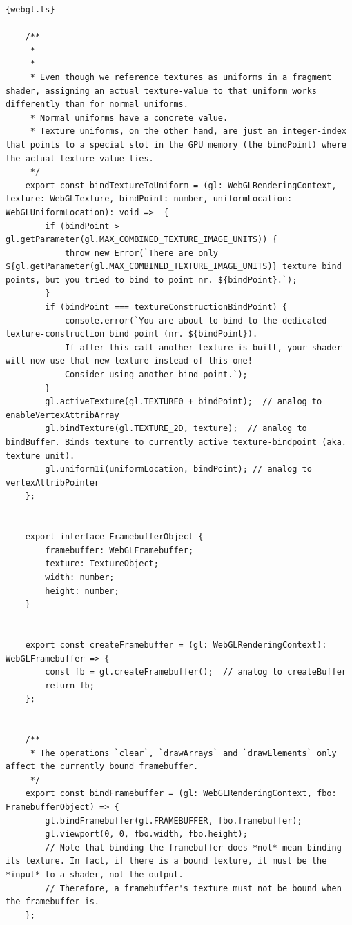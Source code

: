 \begin{lstlisting}{webgl.ts}
    
    /**
     *
     *
     * Even though we reference textures as uniforms in a fragment shader, assigning an actual texture-value to that uniform works differently than for normal uniforms.
     * Normal uniforms have a concrete value.
     * Texture uniforms, on the other hand, are just an integer-index that points to a special slot in the GPU memory (the bindPoint) where the actual texture value lies.
     */
    export const bindTextureToUniform = (gl: WebGLRenderingContext, texture: WebGLTexture, bindPoint: number, uniformLocation: WebGLUniformLocation): void =>  {
        if (bindPoint > gl.getParameter(gl.MAX_COMBINED_TEXTURE_IMAGE_UNITS)) {
            throw new Error(`There are only ${gl.getParameter(gl.MAX_COMBINED_TEXTURE_IMAGE_UNITS)} texture bind points, but you tried to bind to point nr. ${bindPoint}.`);
        }
        if (bindPoint === textureConstructionBindPoint) {
            console.error(`You are about to bind to the dedicated texture-construction bind point (nr. ${bindPoint}).
            If after this call another texture is built, your shader will now use that new texture instead of this one!
            Consider using another bind point.`);
        }
        gl.activeTexture(gl.TEXTURE0 + bindPoint);  // analog to enableVertexAttribArray
        gl.bindTexture(gl.TEXTURE_2D, texture);  // analog to bindBuffer. Binds texture to currently active texture-bindpoint (aka. texture unit).
        gl.uniform1i(uniformLocation, bindPoint); // analog to vertexAttribPointer
    };
    
    
    export interface FramebufferObject {
        framebuffer: WebGLFramebuffer;
        texture: TextureObject;
        width: number;
        height: number;
    }
    
    
    export const createFramebuffer = (gl: WebGLRenderingContext): WebGLFramebuffer => {
        const fb = gl.createFramebuffer();  // analog to createBuffer
        return fb;
    };
    
    
    /**
     * The operations `clear`, `drawArrays` and `drawElements` only affect the currently bound framebuffer.
     */
    export const bindFramebuffer = (gl: WebGLRenderingContext, fbo: FramebufferObject) => {
        gl.bindFramebuffer(gl.FRAMEBUFFER, fbo.framebuffer);
        gl.viewport(0, 0, fbo.width, fbo.height);
        // Note that binding the framebuffer does *not* mean binding its texture. In fact, if there is a bound texture, it must be the *input* to a shader, not the output.
        // Therefore, a framebuffer's texture must not be bound when the framebuffer is.
    };
    

\end{lstlisting}
